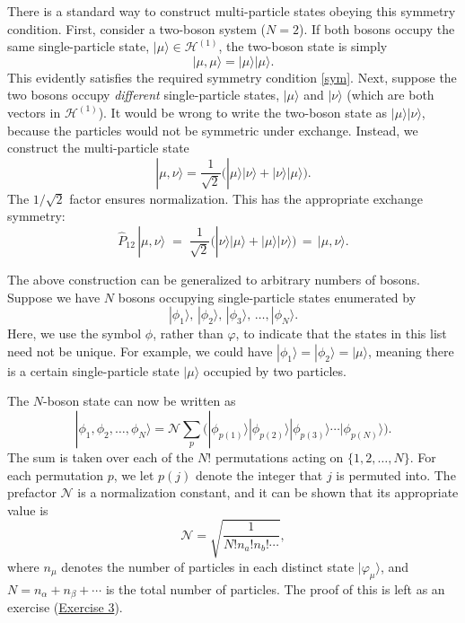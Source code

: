 \documentclass[pra,12pt]{revtex4}
\begin{document}
There is a standard way to construct multi-particle states obeying
this symmetry condition.  First, consider a two-boson system ($N =
2$).  If both bosons occupy the same single-particle state,
$|\mu\rangle \in \mathscr{H}^{(1)}$, the two-boson state is simply
\begin{equation}
  |\mu,\mu\rangle = |\mu\rangle  |\mu\rangle.
\end{equation}
This evidently satisfies the required symmetry condition \eqref{sym}.
Next, suppose the two bosons occupy \textit{different} single-particle
states, $|\mu\rangle$ and $|\nu\rangle$ (which are both vectors in
$\mathscr{H}^{(1)}$).  It would be wrong to write the two-boson state
as $|\mu\rangle |\nu\rangle$, because the particles would not be
symmetric under exchange.  Instead, we construct the multi-particle
state
\begin{equation}
  |\mu,\nu\rangle = \frac{1}{\sqrt{2}} \Big( |\mu\rangle |\nu\rangle +
  |\nu\rangle |\mu\rangle\Big).
\end{equation}
The $1/\sqrt{2}$ factor ensures normalization.  This has the
appropriate exchange symmetry:
\begin{equation}
  \hat{P}_{12}\,|\mu,\nu\rangle \;=\; \frac{1}{\sqrt{2}}
  \Big( |\nu\rangle  |\mu\rangle + |\mu\rangle  |\nu\rangle\Big)
  \,=\, |\mu, \nu\rangle.
\end{equation}

The above construction can be generalized to arbitrary numbers of
bosons.  Suppose we have $N$ bosons occupying single-particle states
enumerated by
\begin{equation}
  |\phi_1\rangle, \, |\phi_2\rangle, \, |\phi_3\rangle, \, \dots, |\phi_N\rangle.
\end{equation}
Here, we use the symbol $\phi$, rather than $\varphi$, to indicate
that the states in this list need not be unique.  For example, we
could have $|\phi_1\rangle = |\phi_2\rangle = |\mu\rangle$, meaning
there is a certain single-particle state $|\mu\rangle$ occupied by two
particles.

The $N$-boson state can now be written as
\begin{equation}
  |\phi_1,\phi_2,\dots,\phi_N\rangle = \mathcal{N} \sum_p
  \Big(|\phi_{p(1)}\rangle  |\phi_{p(2)}\rangle  |\phi_{p(3)}\rangle  \cdots
  |\phi_{p(N)}\rangle\Big).
  \label{nbosons}
\end{equation}
The sum is taken over each of the $N!$ permutations acting on
$\{1,2,\dots,N\}$.  For each permutation $p$, we let $p(j)$ denote the
integer that $j$ is permuted into.  The prefactor $\mathcal{N}$ is a
normalization constant, and it can be shown that its appropriate value
is
\begin{equation}
  \mathcal{N} = \sqrt{\frac{1}{N!n_a!n_b!\cdots}},
\end{equation}
where $n_\mu$ denotes the number of particles in each distinct state
$|\varphi_\mu\rangle$, and $N = n_\alpha + n_\beta + \cdots$ is the
total number of particles.  The proof of this is left as an exercise
(\hyperref[ex:boson_norm]{Exercise 3}).
\end{document}
